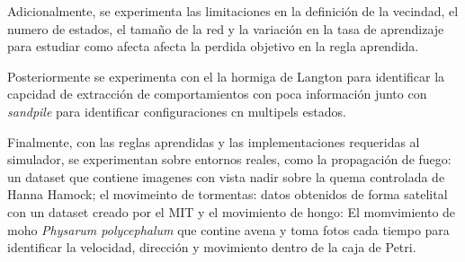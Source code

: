 Adicionalmente, se experimenta las limitaciones en la definición de la vecindad, el numero de estados, el tamaño de la red y la variación en la tasa de aprendizaje para estudiar como afecta afecta la perdida objetivo en la regla aprendida.

Posteriormente se experimenta con el la hormiga de Langton para identificar la capcidad de extracción de comportamientos con poca información junto con \textit{sandpile} para identificar configuraciones cn multipels estados.

Finalmente, con las reglas aprendidas y las implementaciones requeridas al simulador, se experimentan sobre entornos reales, como la propagación de fuego: un dataset que contiene imagenes con vista nadir sobre la quema controlada de Hanna Hamock; el movimeinto de tormentas: datos obtenidos de forma satelital con un dataset creado por el MIT y el movimiento de hongo: El momvimiento de moho \textit{Physarum polycephalum} que contine avena y toma fotos cada tiempo para identificar la velocidad, dirección y movimiento dentro de la caja de Petri.